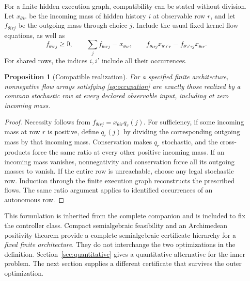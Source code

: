 \documentclass[11pt]{amsart}
\newtheorem{proposition}[theorem]{Proposition}
\theoremstyle{definition}\newtheorem{definition}[theorem]{Definition}
\theoremstyle{remark}\newtheorem{remark}[theorem]{Remark}
\newcommand{\1}{\mathbf 1}
\begin{document}
For a finite hidden execution graph, compatibility can be stated without
division. Let $x_{\theta i r}$ be the incoming mass of hidden history $i$
at observable row $r$, and let $f_{\theta i r j}$ be the outgoing mass
through choice $j$. Include the usual fixed-kernel flow equations, as
well as
\begin{equation}\label{eq:occupation}
 f_{\theta i r j}\ge0,\qquad
 \sum_jf_{\theta i r j}=x_{\theta i r},\qquad
 f_{\theta i r j}x_{\theta'i'r}
 =f_{\theta'i'rj}x_{\theta i r}.
\end{equation}
For shared rows, the indices $i,i'$ include all their occurrences.

\begin{proposition}[Compatible realization]\label{prop:realization}
For a specified finite architecture, nonnegative flow arrays satisfying
\eqref{eq:occupation} are exactly those realized by a common stochastic
row at every declared observable input, including at zero incoming mass.
\end{proposition}
\begin{proof}
Necessity follows from $f_{\theta i rj}=x_{\theta i r}q_r(j)$.
For sufficiency, if some incoming mass at row $r$ is positive, define
$q_r(j)$ by dividing the corresponding outgoing mass by that incoming
mass. Conservation makes $q_r$ stochastic, and the cross-products force
the same ratio at every other positive incoming mass. If an incoming
mass vanishes, nonnegativity and conservation force all its outgoing
masses to vanish. If the entire row is unreachable, choose any legal
stochastic row. Induction through the finite execution graph reconstructs
the prescribed flows. The same ratio argument applies to identified
occurrences of an autonomous row.
\end{proof}

This formulation is inherited from the complete companion and is included
to fix the controller class. Compact semialgebraic feasibility and an
Archimedean positivity theorem provide a complete semialgebraic certificate
hierarchy for a \emph{fixed finite architecture}. They do not interchange
the two optimizations in the definition. Section~\ref{sec:quantitative}
gives a quantitative alternative for the inner problem. The next section
supplies a different certificate that survives the outer optimization.
\end{document}

